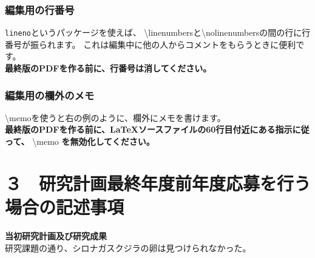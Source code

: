 \documentclass[11pt,a4j,dvipdfmx]{jarticle} 					%
\newcommand{\研究課題名}{象の卵}
\newcommand{\研究機関名}{逢坂大学}
\newcommand{\研究代表者氏名}{湯川秀樹}
\newcommand{\研究期間の最終元号年度}{13}  %
\newcommand{\memo}[1]{\marginpar{#1}}
\begin{document}
        \subsubsection{編集用の行番号}
        \texttt{lineno}というパッケージを使えば、
        \textbackslash linenumbersと\textbackslash nolinenumbersの間の行に行番号が振られます。
        これは編集中に他の人からコメントをもらうときに便利です。\\
        \textbf{最終版のPDFを作る前に、行番号は消してください。}
        
        \subsubsection{編集用の欄外のメモ}
        \textbackslash memo{}を使うと右の例のように、欄外にメモを書けます。\\
        \memo{欄外メモ\\だよ}
        \textbf{最終版のPDFを作る前に、\LaTeX ソースファイルの60行目付近にある指示に従って、}
        \textbackslash memo \textbf{を無効化してください。}
        
        \nolinenumbers




\section{３　研究計画最終年度前年度応募を行う場合の記述事項}

\newcommand{\最終年度研究種目名}{基盤研究（Z）}
\newcommand{\最終年度研究課題番号}{99999}
\newcommand{\最終年度研究課題名}{シロナガスクジラの卵はなぜ見つけられないのか}
\newcommand{\最終年度研究期間}{令和？？年度〜令和\一年目 年度}


\noindent
\textbf{当初研究計画及び研究成果}\\
	研究課題の通り、シロナガスクジラの卵は見つけられなかった。
\\
\end{document}
